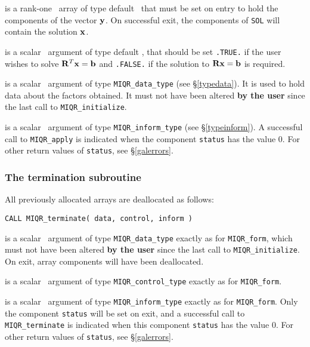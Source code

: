 \documentclass{galahad}
\newcommand{\packagename}{MIQR}
\begin{document}
\vspace*{-3mm}
\begin{description}
 is a rank-one  \intentinout\ array of type default \real\
that must be set on entry to hold the components of the vector ${\mathbf{y}}$.
On successful exit, the components of {\tt SOL} will contain the solution 
${\mathbf{x}}$.

 is a scalar \intentin\ argument of type default \logical,
that should be set {\tt .TRUE.} if the user wishes to solve
${\mathbf{R}}^T {\mathbf{x}} = {\mathbf{b}}$ and {\tt .FALSE.} if the solution to 
${\mathbf{R}} {\mathbf{x}} = {\mathbf{b}}$ is required.

 is a scalar \intentinout\ argument of type 
{\tt \packagename\_data\_type}
(see \S\ref{typedata}). It is used to hold data about the factors obtained.
It must not have been altered {\bf by the user} since the last call to 
{\tt \packagename\_initialize}.

 is a scalar \intentout\ argument of type 
{\tt \packagename\_inform\_type}
(see \S\ref{typeinform}). A successful call to {\tt \packagename\_apply} 
is indicated when the  component {\tt status} has the value 0. 
For other return values of {\tt status}, see \S\ref{galerrors}.

\end{description}


\subsubsection{The  termination subroutine}
All previously allocated arrays are deallocated as follows:
\vspace*{1mm}

\hspace{8mm}
{\tt CALL \packagename\_terminate( data, control, inform )}

\begin{description}

 is a scalar \intentinout\ argument of type 
{\tt \packagename\_data\_type} 
exactly as for
{\tt \packagename\_form},
which must not have been altered {\bf by the user} since the last call to 
{\tt \packagename\_initialize}.
On exit, array components will have been deallocated.

 is a scalar \intentin\ argument of type 
{\tt \packagename\_control\_type}
exactly as for
{\tt \packagename\_form}.

 is a scalar \intentout\ argument of type
{\tt \packagename\_inform\_type}
exactly as for
{\tt \packagename\_form}.
Only the component {\tt status} will be set on exit, and a 
successful call to 
{\tt \packagename\_terminate}
is indicated when this  component {\tt status} has the value 0. 
For other return values of {\tt status}, see \S\ref{galerrors}.

\end{description}
\end{document}
